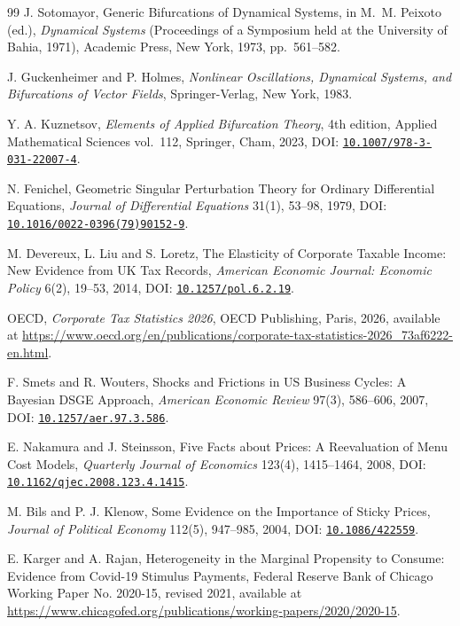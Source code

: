 \documentclass[review,12pt]{elsarticle}
\theoremstyle{plain}
\theoremstyle{definition}
\theoremstyle{remark}
\begin{document}
\begin{thebibliography}{99}
 J. Sotomayor, Generic Bifurcations of Dynamical Systems, in M.~M. Peixoto (ed.), \emph{Dynamical Systems} (Proceedings of a Symposium held at the University of Bahia, 1971), Academic Press, New York, 1973, pp.~561--582.

 J. Guckenheimer and P. Holmes, \emph{Nonlinear Oscillations, Dynamical Systems, and Bifurcations of Vector Fields}, Springer-Verlag, New York, 1983.

 Y. A. Kuznetsov, \emph{Elements of Applied Bifurcation Theory}, 4th edition, Applied Mathematical Sciences vol.~112, Springer, Cham, 2023, DOI: \href{https://doi.org/10.1007/978-3-031-22007-4}{\texttt{10.1007/978-3-031-22007-4}}.

 N. Fenichel, Geometric Singular Perturbation Theory for Ordinary Differential Equations, \emph{Journal of Differential Equations} 31(1), 53--98, 1979, DOI: \href{https://doi.org/10.1016/0022-0396(79)90152-9}{\texttt{10.1016/0022-0396(79)90152-9}}.

 M. Devereux, L. Liu and S. Loretz, The Elasticity of Corporate Taxable Income: New Evidence from UK Tax Records, \emph{American Economic Journal: Economic Policy} 6(2), 19--53, 2014, DOI: \href{https://doi.org/10.1257/pol.6.2.19}{\texttt{10.1257/pol.6.2.19}}.

 OECD, \emph{Corporate Tax Statistics 2026}, OECD Publishing, Paris, 2026, available at \url{https://www.oecd.org/en/publications/corporate-tax-statistics-2026\_73af6222-en.html}.

 F. Smets and R. Wouters, Shocks and Frictions in US Business Cycles: A Bayesian DSGE Approach, \emph{American Economic Review} 97(3), 586--606, 2007, DOI: \href{https://doi.org/10.1257/aer.97.3.586}{\texttt{10.1257/aer.97.3.586}}.

 E. Nakamura and J. Steinsson, Five Facts about Prices: A Reevaluation of Menu Cost Models, \emph{Quarterly Journal of Economics} 123(4), 1415--1464, 2008, DOI: \href{https://doi.org/10.1162/qjec.2008.123.4.1415}{\texttt{10.1162/qjec.2008.123.4.1415}}.

 M. Bils and P. J. Klenow, Some Evidence on the Importance of Sticky Prices, \emph{Journal of Political Economy} 112(5), 947--985, 2004, DOI: \href{https://doi.org/10.1086/422559}{\texttt{10.1086/422559}}.

 E. Karger and A. Rajan, Heterogeneity in the Marginal Propensity to Consume: Evidence from Covid-19 Stimulus Payments, Federal Reserve Bank of Chicago Working Paper No. 2020-15, revised 2021, available at \url{https://www.chicagofed.org/publications/working-papers/2020/2020-15}.


\end{thebibliography}
\end{document}
